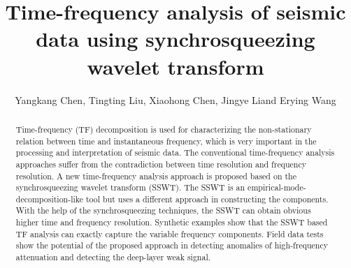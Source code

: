 
\title{Time-frequency analysis of seismic data using synchrosqueezing wavelet transform}
\renewcommand{\thefootnote}{\fnsymbol{footnote}}

\author{Yangkang Chen\footnotemark[1], Tingting Liu\footnotemark[2], Xiaohong Chen\footnotemark[2], Jingye Li\footnotemark[2] and Erying Wang\footnotemark[3]}

\address{
\footnotemark[1]Bureau of Economic Geology \\
John A. and Katherine G. Jackson School of Geosciences \\
The University of Texas at Austin \\
University Station, Box X \\
Austin, TX 78713-8924 \\
ykchen@utexas.edu\\
+1-5125478899 \\
ykchen@utexas.edu\\

\footnotemark[2] State Key Laboratory of Petroleum Resources and Prospecting \\
China University of Petroleum \\
Fuxue Road 18th\\
Beijing, China, 102200 \\
liutingjiy@126.com \\

\footnotemark[3] PetroChina Changqing Oilfield Company \\
Weiyang Road 35th \\
Xi'an,Shaanxi Province,China \\ 
wswey2008@126.com\\
}


\maketitle

\begin{abstract}
Time-frequency (TF) decomposition is used for characterizing the non-stationary relation between time and instantaneous frequency, which is very important in the processing and interpretation of seismic data. The conventional time-frequency analysis approaches suffer from the contradiction between time resolution and frequency resolution. A new time-frequency analysis approach is proposed based on the synchrosqueezing wavelet transform (SSWT). The SSWT is an empirical-mode-decomposition-like tool but uses a different approach in constructing the components. With the help of the synchrosqueezing techniques, the SSWT can obtain obvious higher time and frequency resolution. Synthetic examples show that the SSWT based TF analysis can exactly capture the variable frequency components. Field data tests show the potential of the proposed approach in detecting anomalies of high-frequency attenuation and detecting the deep-layer weak signal.
\end{abstract}

